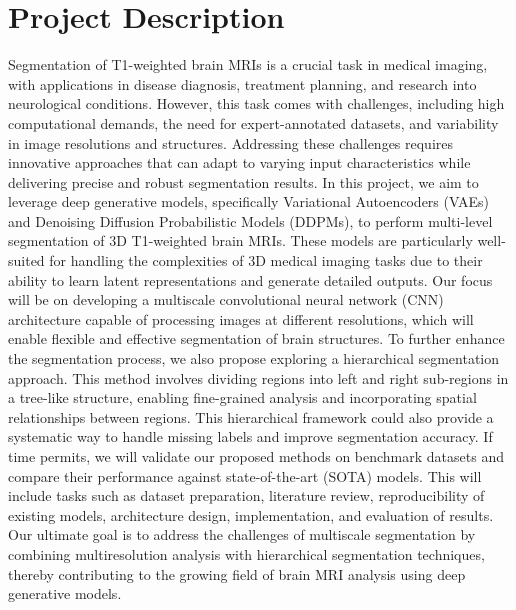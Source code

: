 \documentclass[12pt]{report}
\begin{document}
\section*{Project Description}
Segmentation of T1-weighted brain MRIs is a crucial task in medical imaging, with applications in disease diagnosis, treatment planning, and research into neurological conditions. However, this task comes with challenges, including high computational demands, the need for expert-annotated datasets, and variability in image resolutions and structures. Addressing these challenges requires innovative approaches that can adapt to varying input characteristics while delivering precise and robust segmentation results.
\newline
\newline
In this project, we aim to leverage deep generative models, specifically Variational Autoencoders (VAEs) and Denoising Diffusion Probabilistic Models (DDPMs), to perform multi-level segmentation of 3D T1-weighted brain MRIs. These models are particularly well-suited for handling the complexities of 3D medical imaging tasks due to their ability to learn latent representations and generate detailed outputs. Our focus will be on developing a multiscale convolutional neural network (CNN) architecture capable of processing images at different resolutions, which will enable flexible and effective segmentation of brain structures.
\newline
\newline
To further enhance the segmentation process, we also propose exploring a hierarchical segmentation approach. This method involves dividing regions into left and right sub-regions in a tree-like structure, enabling fine-grained analysis and incorporating spatial relationships between regions. This hierarchical framework could also provide a systematic way to handle missing labels and improve segmentation accuracy.
\newline
\newline
If time permits, we will validate our proposed methods on benchmark datasets and compare their performance against state-of-the-art (SOTA) models. This will include tasks such as dataset preparation, literature review, reproducibility of existing models, architecture design, implementation, and evaluation of results.
\newline
\newline
Our ultimate goal is to address the challenges of multiscale segmentation by combining multiresolution analysis with hierarchical segmentation techniques, thereby contributing to the growing field of brain MRI analysis using deep generative models.
\end{document}
